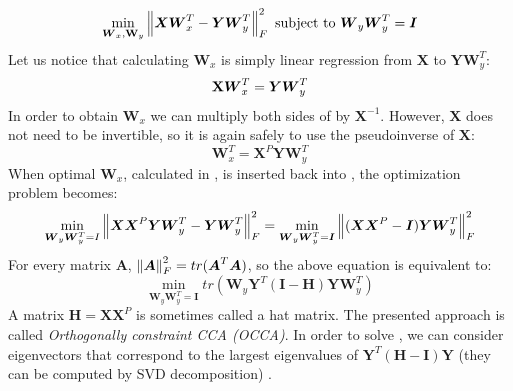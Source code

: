 \documentclass[english,a4paper,twoside]{ppfcmthesis}
\begin{document}
\begin{equation}\label{eq:cplst1}
    \min_{\boldsymbol{W}_x, \bold{W}_y} \left\lVert\boldsymbol{X}\boldsymbol{W}_x^T-\boldsymbol{Y}\boldsymbol{W}_y^T\right\rVert_{F}^2  
    \text{  subject to   } \boldsymbol{W}_y\boldsymbol{W}_y^T=\boldsymbol{I}   
\end{equation}
Let us notice that calculating $\boldsymbol{W}_x$ is simply linear regression from $\boldsymbol{X}$ to $\boldsymbol{Y}\boldsymbol{W}_y^T$:
\begin{equation}\label{eq:cplst2}
    \bold{X}\boldsymbol{W}_x^T=\boldsymbol{Y}\boldsymbol{W}_y^T \\
\end{equation}
In order to obtain $\boldsymbol{W}_x$ we can multiply both sides of  by $\boldsymbol{X}^{-1}$. However, $\boldsymbol{X}$ does not need to be invertible, so it is again safely to use the pseudoinverse of $\boldsymbol{X}$: 
\begin{equation}\label{eq:cplst2_inv}
    \boldsymbol{W}_x^T=\boldsymbol{X}^P\boldsymbol{Y}\boldsymbol{W}_y^T
\end{equation}
When optimal $\boldsymbol{W}_x$, calculated in , is inserted back into , the optimization problem becomes:
\begin{equation}\label{eq:cplst3}
    \min_{\boldsymbol{W}_y\boldsymbol{W}_y^T=I} \left\lVert\boldsymbol{X}\boldsymbol{X}^P\boldsymbol{Y}\boldsymbol{W}_y^T-\boldsymbol{Y}\boldsymbol{W}_y^T\right\rVert_{F}^2=\min_{\boldsymbol{W}_y\boldsymbol{W}_y^T=\boldsymbol{I}} \left\lVert(\boldsymbol{X}\boldsymbol{X}^P-\boldsymbol{I})\boldsymbol{Y}\boldsymbol{W}_y^T\right\rVert_{F}^2
\end{equation}
For every matrix $\boldsymbol{A}$, $\left\lVert\boldsymbol{A}\right\rVert_{F}^2=tr(\boldsymbol{A}^T\boldsymbol{A})$, so the above equation is equivalent to:
\begin{equation}\label{eq:cplst4}
    \min_{\boldsymbol{W}_y\boldsymbol{W}_y^T=\boldsymbol{I}} tr(\boldsymbol{W}_y\boldsymbol{Y}^T(\boldsymbol{I}-\boldsymbol{H})\boldsymbol{Y}\boldsymbol{W}_y^T)
\end{equation}
A matrix $\boldsymbol{H}=\boldsymbol{X}\boldsymbol{X}^P$ is sometimes called a hat matrix. The presented approach is called \textit{Orthogonally constraint CCA (OCCA)}. In order to solve , we can consider eigenvectors that correspond to the largest eigenvalues of $\boldsymbol{Y}^T(\boldsymbol{H}-\boldsymbol{I})\boldsymbol{Y}$ (they can be computed by SVD decomposition) \citep{ChenLin}.
\end{document}
